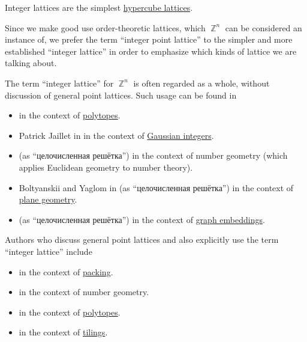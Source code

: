 \begin{comments}
  \item Integer lattices are the simplest \hyperref[def:hypercubic_point_lattice]{hypercube lattices}.

  \item Since we make good use order-theoretic lattices, which \( \BbbZ^n \) can be considered an instance of, we prefer the term \enquote{integer point lattice} to the simpler and more established \enquote{integer lattice} in order to emphasize which kinds of lattice we are talking about.

  \item The term \enquote{integer lattice} for \( \BbbZ^n \) is often regarded as a whole, without discussion of general point lattices. Such usage can be found in
  \begin{itemize}
    \item {} in the context of \hyperref[def:polytope]{polytopes}.
    \item Patrick Jaillet in \cite[503]{RosenEtAl2018DiscreteMathematicsHandbook} in the context of \hyperref[def:gaussian_integers]{Gaussian integers}.
    \item {} (as \enquote{целочисленная решётка}) in the context of number geometry (which applies Euclidean geometry to number theory).
    \item Boltyanskii and Yaglom in \cite[256]{АлександровМаркушевичХинчинИПр1966ЭнциклопедияТом5} (as \enquote{целочисленная решётка}) in the context of \hyperref[def:euclidean_plane]{plane geometry}.
    \item {} (as \enquote{целочисленная решётка}) in the context of \hyperref[def:graph_geometric_realization/embedding]{graph embeddings}.
  \end{itemize}

  Authors who discuss general point lattices and also explicitly use the term \enquote{integer lattice} include
  \begin{itemize}
    \item {} in the context of \hyperref[def:topological_space_packing]{packing}.
    \item {} in the context of number geometry.
    \item {} in the context of \hyperref[def:polytope]{polytopes}.
    \item {} in the context of \hyperref[def:topological_space_tiling]{tilings}.
  \end{itemize}
\end{comments}

